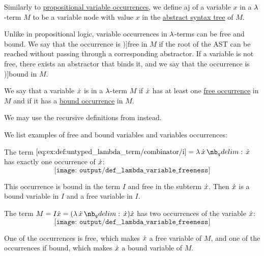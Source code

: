 \begin{definition}\label{def:lambda_variable_occurrence}\mimprovised
  Similarly to \hyperref[def:propositional_variable_occurrence]{propositional variable occurrences}, we define aj  of a variable \( x \) in a \( \mathrm{\lambda} \)-term \( M \) to be a variable node with value \( x \) in the \hyperref[def:untyped_lambda_term_ast]{abstract syntax tree} of \( M \).

  Unlike in propositional logic, variable occurrences in \( \mathrm{\lambda} \)-terms can be free and bound. We say that the occurrence is \term[ru=свободное (вхождение) (\cite[64]{Герасимов2011})]{free} in \( M \) if the root of the AST can be reached without passing through a corresponding abstractor. If a variable is not free, there exists an abstractor that binds it, and we say that the occurrence is \term[ru=связанное (вхождение) (\cite[64]{Герасимов2011})]{bound} in \( M \).
\end{definition}

\begin{definition}\label{def:lambda_variable_freeness}\mimprovised
  We say that a variable \( {\dot{x}} \) is  in a \( \mathrm{\lambda} \)-term \( M \) if \( {\dot{x}} \) has at least one \hyperref[def:lambda_variable_occurrence]{free occurrence} in \( M \) and  if it has a \hyperref[def:lambda_variable_occurrence]{bound occurrence} in \( M \).
\end{definition}
\begin{comments}
  \item We may use the recursive definitions from  instead.
\end{comments}

\begin{example}\label{ex:def:lambda_variable_freeness}
  We list examples of free and bound variables and variables occurrences:
  \begin{thmenum}
     The term \( \ref{eq:ex:def:untyped_lambda_term/combinator/i} = \qabs \synx \synx \) has exactly one occurrence of \( {\dot{x}} \):
    \begin{equation*}
      \texttt{[image: output/def\_\_lambda\_variable\_freeness]}
    \end{equation*}

     This occurrence is bound in the term \( I \) and free in the subterm \( {\dot{x}} \). Then \( {\dot{x}} \) is a bound variable in \( I \) and a free variable in \( I \).

     The term \( M = I \synx = (\qabs \synx \synx) \synx \) has two occurrences of the variable \( {\dot{x}} \):
    \begin{equation*}
      \texttt{[image: output/def\_\_lambda\_variable\_freeness]}
    \end{equation*}

    One of the occurrences is free, which makes \( {\dot{x}} \) a free variable of \( M \), and one of the occurrences if bound, which makes \( {\dot{x}} \) a bound variable of \( M \).
  \end{thmenum}
\end{example}

